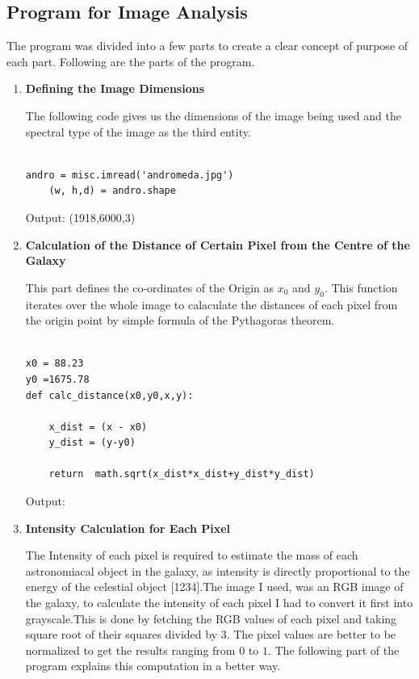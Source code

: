 \subsection{Program for Image Analysis}
The program was divided into a few parts to create a clear concept of purpose of each part. Following are the parts of the program.
\begin{enumerate}
\item \textbf{Defining the Image Dimensions}

The following code gives us the dimensions of the image being used and the spectral type of the image as the third entity.

\begin{verbatim}

andro = misc.imread('andromeda.jpg')
    (w, h,d) = andro.shape
\end{verbatim}

Output: (1918,6000,3)


\item \textbf{Calculation of the Distance of Certain Pixel from the Centre of the Galaxy}

This part defines the co-ordinates of the Origin as $x_{0}$ and $y_{0}$. This function iterates over the whole image to calaculate the distances of each pixel from the origin point by simple formula of the Pythagoras theorem.

\begin{verbatim}

x0 = 88.23
y0 =1675.78
def calc_distance(x0,y0,x,y):

    x_dist = (x - x0)
    y_dist = (y-y0)

    return  math.sqrt(x_dist*x_dist+y_dist*y_dist)

\end{verbatim}
Output:

\item \textbf{Intensity Calculation for Each Pixel}

The Intensity of each pixel is required to estimate the mass of each astronomiacal object in the galaxy, as intensity is directly proportional to the energy of the celestial object [1234].The image I used, was an RGB image of the galaxy, to calculate the intensity of each pixel I had to convert it first into grayscale.This is done by fetching the RGB values of each pixel and taking square root of their squares divided by $3$. The pixel values are better to be normalized to get the results ranging from $0$ to $1$. The following part of the program explains this computation in a better way.


\end{enumerate}
